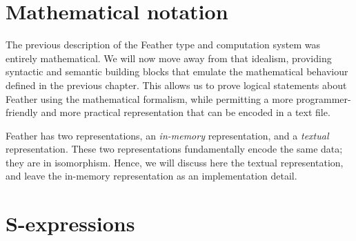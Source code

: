 \documentclass[11pt]{book}
\begin{document}
\section{Mathematical notation}

The previous description of the Feather type and computation system was entirely mathematical.
We will now move away from that idealism, providing syntactic and semantic building blocks that emulate the mathematical behaviour defined in the previous chapter.
This allows us to prove logical statements about Feather using the mathematical formalism, while permitting a more programmer-friendly and more practical representation that can be encoded in a text file.

Feather has two representations, an \textit{in-memory} representation, and a \textit{textual} representation.
These two representations fundamentally encode the same data; they are in isomorphism.
Hence, we will discuss here the textual representation, and leave the in-memory representation as an implementation detail.

\section{S-expressions}
\end{document}
